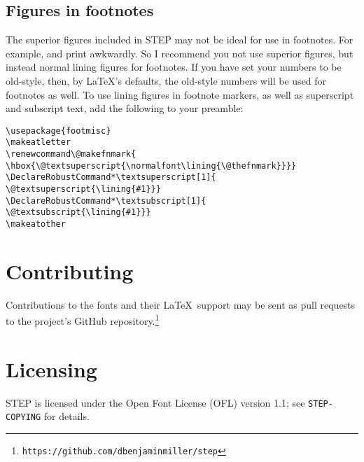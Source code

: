 \documentclass[12pt]{article}
\makeatletter
\renewcommand\@makefnmark{\hbox{\@textsuperscript{\normalfont\lining{\@thefnmark}}}}
\DeclareRobustCommand*\textsuperscript[1]{\@textsuperscript{\lining{#1}}}
\DeclareRobustCommand*\textsubscript[1]{\@textsubscript{\lining{#1}}}
\makeatother
\begin{document}
\subsection{Figures in footnotes}
The superior figures included in STEP may not be ideal for use in footnotes. For example,  and  print awkwardly. So I recommend you not use superior figures, but instead normal lining figures for footnotes. If you have set your numbers to be old-style, then, by \LaTeX's defaults, the old-style numbers will be used for footnotes as well. To use lining figures in footnote markers, as well as superscript and subscript text, add the following to your preamble:
\begin{verbatim}
\usepackage{footmisc}
\makeatletter
\renewcommand\@makefnmark{
\hbox{\@textsuperscript{\normalfont\lining{\@thefnmark}}}}
\DeclareRobustCommand*\textsuperscript[1]{
\@textsuperscript{\lining{#1}}}
\DeclareRobustCommand*\textsubscript[1]{
\@textsubscript{\lining{#1}}}
\makeatother
\end{verbatim}
\section{Contributing}
Contributions to the fonts and their \LaTeX\ support may be sent as pull requests to the project's GitHub repository.\footnote{\texttt{https://github.com/dbenjaminmiller/step}}
\section{Licensing}
STEP is licensed under the Open Font License (OFL) version 1.1; see \texttt{STEP-COPYING} for details.
\end{document}
